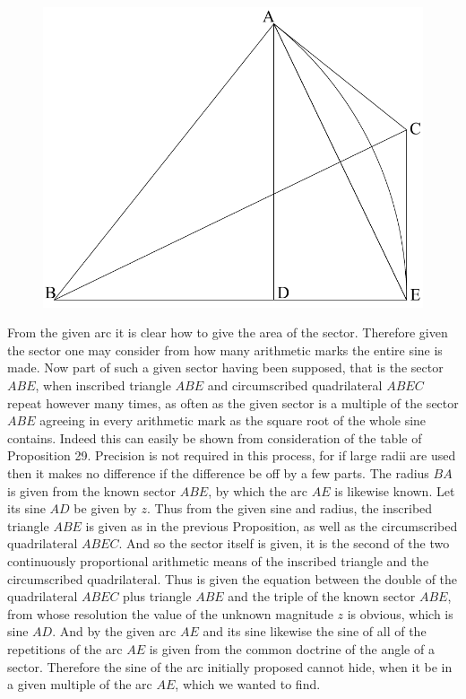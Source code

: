 \documentclass[11pt,letterpaper]{book}
\begin{document}
\begin{figure}[h!]
\includegraphics[scale=0.95]{vera_ii}
\end{figure}

From the given arc it is clear how to give the area of the sector. Therefore
given the sector one may consider from how many arithmetic marks the entire
sine is made. Now part of such a given sector having been supposed, that is the
sector $ABE$, when inscribed triangle $ABE$ and circumscribed quadrilateral $ABEC$
repeat however many times, as often as the given sector is a multiple of the 
sector $ABE$ agreeing in every arithmetic mark as the square root of the whole
sine contains. Indeed this can easily be shown from consideration of the table of
Proposition 29. Precision is not required in this process, for if large radii are
used then it makes no difference if the difference be off by a few parts. The
radius $BA$ is given from the known sector $ABE$, by which the arc $AE$ is
likewise known. Let its sine $AD$ be given by $z$. Thus from the given sine
and radius, the inscribed triangle $ABE$ is given as in the previous Proposition,
as well as the circumscribed quadrilateral $ABEC$. And so the sector itself is
given, it is the second of the two continuously proportional arithmetic means of
the inscribed triangle and the circumscribed quadrilateral. Thus is given the
equation between the double of the quadrilateral $ABEC$ plus triangle $ABE$ 
and the triple of the known sector $ABE$, from whose resolution the value of
the unknown magnitude $z$ is obvious, which is sine $AD$. And by the given arc
$AE$ and its sine likewise the sine of all of the repetitions of the arc $AE$
is given from the common doctrine of the angle of a sector. Therefore the sine
of the arc initially proposed cannot hide, when it be in a given multiple of
the arc $AE$, which we wanted to find.
\end{document}
